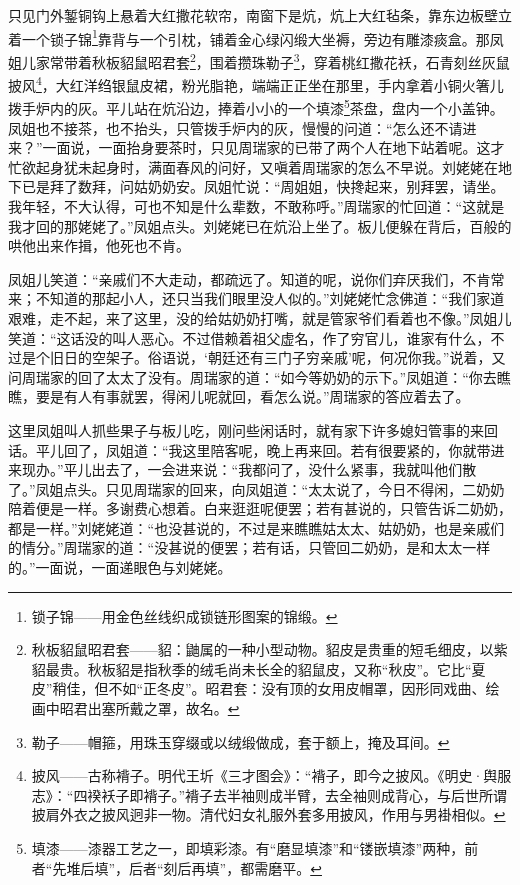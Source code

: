 \par 只见门外錾铜钩上悬着大红撒花软帘，南窗下是炕，炕上大红毡条，靠东边板壁立着一个锁子锦\footnote{锁子锦——用金色丝线织成锁链形图案的锦缎。}靠背与一个引枕，铺着金心绿闪缎大坐褥，旁边有雕漆痰盒。那凤姐儿家常带着秋板貂鼠昭君套\footnote{秋板貂鼠昭君套——貂：鼬属的一种小型动物。貂皮是贵重的短毛细皮，以紫貂最贵。秋板貂是指秋季的绒毛尚未长全的貂鼠皮，又称“秋皮”。它比“夏皮”稍佳，但不如“正冬皮”。昭君套：没有顶的女用皮帽罩，因形同戏曲、绘画中昭君出塞所戴之罩，故名。}，围着攒珠勒子\footnote{勒子——帽箍，用珠玉穿缀或以绒缎做成，套于额上，掩及耳间。}，穿着桃红撒花袄，石青刻丝灰鼠披风\footnote{披风——古称褙子。明代王圻《三才图会》：“褙子，即今之披风。《明史·舆服志》：“四䙆袄子即褙子。”褙子去半袖则成半臂，去全袖则成背心，与后世所谓披肩外衣之披风迥非一物。清代妇女礼服外套多用披风，作用与男褂相似。}，大红洋绉银鼠皮裙，粉光脂艳，端端正正坐在那里，手内拿着小铜火箸儿拨手炉内的灰。平儿站在炕沿边，捧着小小的一个填漆\footnote{填漆——漆器工艺之一，即填彩漆。有“磨显填漆”和“镂嵌填漆”两种，前者“先堆后填”，后者“刻后再填”，都需磨平。}茶盘，盘内一个小盖钟。凤姐也不接茶，也不抬头，只管拨手炉内的灰，慢慢的问道：“怎么还不请进来？”一面说，一面抬身要茶时，只见周瑞家的已带了两个人在地下站着呢。这才忙欲起身犹未起身时，满面春风的问好，又嗔着周瑞家的怎么不早说。刘姥姥在地下已是拜了数拜，问姑奶奶安。凤姐忙说：“周姐姐，快搀起来，别拜罢，请坐。我年轻，不大认得，可也不知是什么辈数，不敢称呼。”周瑞家的忙回道：“这就是我才回的那姥姥了。”凤姐点头。刘姥姥已在炕沿上坐了。板儿便躲在背后，百般的哄他出来作揖，他死也不肯。
\par 凤姐儿笑道：“亲戚们不大走动，都疏远了。知道的呢，说你们弃厌我们，不肯常来；不知道的那起小人，还只当我们眼里没人似的。”刘姥姥忙念佛道：“我们家道艰难，走不起，来了这里，没的给姑奶奶打嘴，就是管家爷们看着也不像。”凤姐儿笑道：“这话没的叫人恶心。不过借赖着祖父虚名，作了穷官儿，谁家有什么，不过是个旧日的空架子。俗语说，‘朝廷还有三门子穷亲戚’呢，何况你我。”说着，又问周瑞家的回了太太了没有。周瑞家的道：“如今等奶奶的示下。”凤姐道：“你去瞧瞧，要是有人有事就罢，得闲儿呢就回，看怎么说。”周瑞家的答应着去了。
\par 这里凤姐叫人抓些果子与板儿吃，刚问些闲话时，就有家下许多媳妇管事的来回话。平儿回了，凤姐道：“我这里陪客呢，晚上再来回。若有很要紧的，你就带进来现办。”平儿出去了，一会进来说：“我都问了，没什么紧事，我就叫他们散了。”凤姐点头。只见周瑞家的回来，向凤姐道：“太太说了，今日不得闲，二奶奶陪着便是一样。多谢费心想着。白来逛逛呢便罢；若有甚说的，只管告诉二奶奶，都是一样。”刘姥姥道：“也没甚说的，不过是来瞧瞧姑太太、姑奶奶，也是亲戚们的情分。”周瑞家的道：“没甚说的便罢；若有话，只管回二奶奶，是和太太一样的。”一面说，一面递眼色与刘姥姥。

